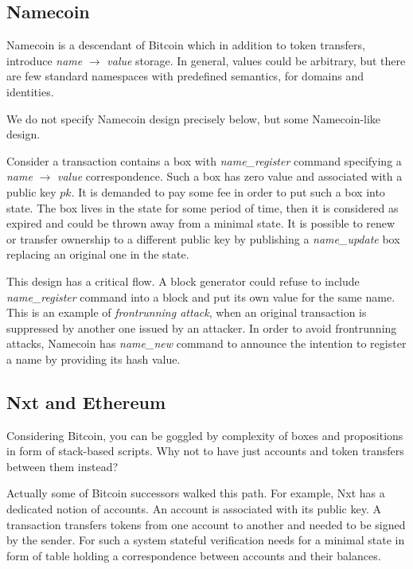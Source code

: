 \documentclass[]{report}   %
\begin{document}
\subsection{Namecoin}

Namecoin is a descendant of Bitcoin which in addition to token transfers, introduce \textit{name} $\rightarrow$ \textit{value} storage. In general, values could be arbitrary, but there are few  standard namespaces with predefined semantics, for domains and identities.

We do not specify Namecoin design precisely below, but some Namecoin-like design. 

Consider a transaction contains a box with \textit{name\_register} command specifying a \textit{name} $\rightarrow$ \textit{value} correspondence. Such a box has zero value and associated with a public key \(pk\). It is demanded to pay some fee in order to put such a box into state. The box lives in the state for some period of time, then it is considered as expired and could be thrown away from a minimal state. It is possible to renew or transfer ownership to a different public key by publishing a \textit{name\_update} box replacing an original one in the state.

This design has a critical flow. A block generator could refuse to include \textit{name\_register} command into a block and put its own value for the same name. This is an example of \textit{frontrunning attack}, when an original transaction is suppressed by another one issued by an attacker. In order to avoid frontrunning attacks, Namecoin has \textit{name\_new} command to announce the intention to register a name by providing its hash value.


\subsection{Nxt and Ethereum}	

Considering Bitcoin, you can be goggled by complexity of boxes and propositions in form of stack-based scripts. Why not to have just accounts and token transfers between them instead? 

Actually some of Bitcoin successors walked this path. For example, Nxt has a dedicated notion of accounts. An account is associated with its public key. A transaction transfers tokens from one account to another and needed to be signed by the sender. For such a system stateful verification needs for a minimal state in form of table holding a correspondence between accounts and their balances.
\end{document}
